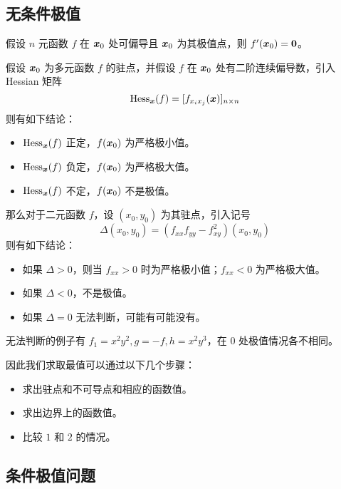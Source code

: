 \subsection{无条件极值}

\begin{theorem}
	假设 $n$ 元函数 $f$ 在 $\boldsymbol{x}_0$ 处可偏导且 $\boldsymbol{x}_0$ 为其极值点，则 $f'(\boldsymbol{x}_0) = \boldsymbol{0}$。
\end{theorem}

\begin{theorem}
	假设 $\boldsymbol{x}_0$ 为多元函数 $f$ 的驻点，并假设 $f$ 在 $\boldsymbol{x}_0$ 处有二阶连续偏导数，引入 Hessian 矩阵
	\[ \operatorname{Hess}_{\boldsymbol{x}}(f) = [f_{x_i x_j}(\boldsymbol{x})]_{n \times n} \]
	则有如下结论：
	\begin{itemize}
		\item $\operatorname{Hess}_{\boldsymbol{x}}(f)$ 正定，$f(\boldsymbol{x}_0)$ 为严格极小值。
		\item $\operatorname{Hess}_{\boldsymbol{x}}(f)$ 负定，$f(\boldsymbol{x}_0)$ 为严格极大值。
		\item $\operatorname{Hess}_{\boldsymbol{x}}(f)$ 不定，$f(\boldsymbol{x}_0)$ 不是极值。
	\end{itemize}
\end{theorem}

那么对于二元函数 $f$，设 $(x_0, y_0)$ 为其驻点，引入记号
\[ \Delta(x_0, y_0) = (f_{xx} f_{yy} - f_{xy}^2)(x_0, y_0) \]
则有如下结论：
\begin{itemize}
	\item 如果 $\Delta > 0$，则当 $f_{xx} > 0$ 时为严格极小值；$f_{xx} < 0$ 为严格极大值。
	\item 如果 $\Delta < 0$，不是极值。
	\item 如果 $\Delta = 0$ 无法判断，可能有可能没有。
\end{itemize}

无法判断的例子有 $f_1 = x^2y^2, g = -f, h = x^2 y^3$，在 $0$ 处极值情况各不相同。

因此我们求取最值可以通过以下几个步骤：

\begin{itemize}
	\item 求出驻点和不可导点和相应的函数值。
	\item 求出边界上的函数值。
	\item 比较 $1$ 和 $2$ 的情况。
\end{itemize}

\subsection{条件极值问题}

